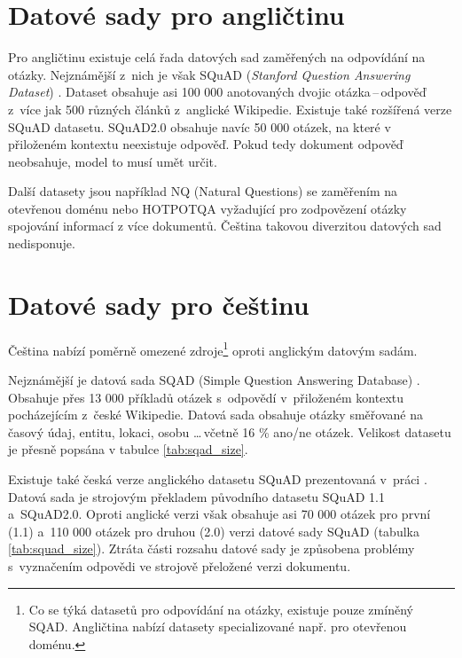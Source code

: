 \section{Datové sady pro angličtinu}
Pro angličtinu existuje celá řada datových sad zaměřených na odpovídání na otázky. Nejznámější z~nich je však SQuAD (\emph{Stanford Question Answering Dataset}) \cite{squad}. Dataset obsahuje asi 100 000 anotovaných dvojic otázka\,--\,odpověď z~více jak 500 různých článků z~anglické Wikipedie. Existuje také rozšířená verze SQuAD datasetu. SQuAD2.0 \cite{squad_v2} obsahuje navíc 50 000 otázek, na které v~ přiloženém kontextu neexistuje odpověď. Pokud tedy dokument odpověď neobsahuje, model to musí umět určit.\par
Další datasety jsou například NQ (Natural Questions) se zaměřením na otevřenou doménu nebo HOTPOTQA vyžadující pro zodpovězení otázky spojování informací z více dokumentů. Čeština takovou diverzitou datových sad nedisponuje.

\section{Datové sady pro češtinu}
Čeština nabízí poměrně omezené zdroje\footnote{Co se týká datasetů pro odpovídání na otázky, existuje pouze zmíněný SQAD. Angličtina nabízí datasety specializované např. pro otevřenou doménu.} oproti anglickým datovým sadám.\par 
Nejznámější je datová sada SQAD (Simple Question Answering Database) \cite{sqad}. Obsahuje přes 13 000 příkladů otázek s~odpovědí v~přiloženém kontextu pocházejícím z~české Wikipedie. Datová sada obsahuje otázky směřované na časový údaj, entitu, lokaci, osobu \dots \,včetně 16 \% ano/ne otázek. Velikost datasetu je přesně popsána v tabulce \ref{tab:sqad_size}.\par
Existuje také česká verze anglického datasetu SQuAD prezentovaná v~práci \cite{czech_squad}. Datová sada je strojovým překladem původního datasetu SQuAD 1.1 a~SQuAD2.0. Oproti anglické verzi však obsahuje asi 70 000 otázek pro první (1.1) a~110 000 otázek pro druhou (2.0) verzi datové sady SQuAD (tabulka \ref{tab:squad_size}). Ztráta části rozsahu datové sady je způsobena problémy s~vyznačením odpovědi ve strojově přeložené verzi dokumentu.

